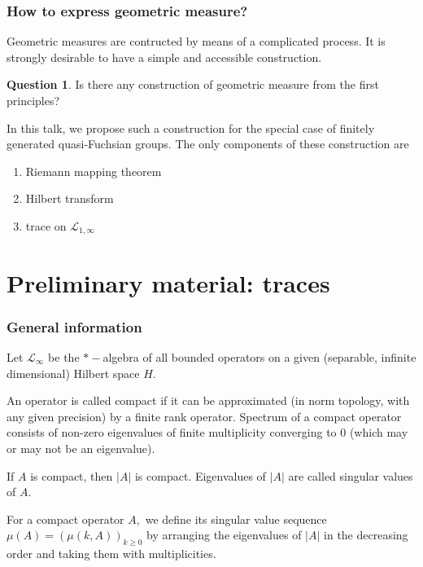 \documentclass{beamer}
\theoremstyle{definition}
\newtheorem{quest}{Question}
\begin{document}
\begin{frame}
\frametitle{How to express geometric measure?}

Geometric measures are contructed by means of a complicated process. It is strongly desirable to have a simple and accessible construction.

\begin{quest} Is there any construction of geometric measure from the first principles?
\end{quest}

In this talk, we propose such a construction for the special case of finitely generated quasi-Fuchsian groups. The only components of these construction are
\begin{enumerate}
\item Riemann mapping theorem
\item Hilbert transform 
\item trace on $\mathcal{L}_{1,\infty}$
\end{enumerate}
\end{frame}

\section{Preliminary material: traces}

\begin{frame} 
\frametitle{General information}

Let $\mathcal{L}_{\infty}$ be the $*-$algebra of all bounded operators on a given (separable, infinite dimensional) Hilbert space $H.$ 

An operator is called compact if it can be approximated (in norm topology, with any given precision) by a finite rank operator. Spectrum of a compact operator consists of non-zero eigenvalues of finite multiplicity converging to $0$ (which may or may not be an eigenvalue). 

If $A$ is compact, then $|A|$ is compact. Eigenvalues of $|A|$ are called singular values of $A.$

For a compact operator $A,$ we define its singular value sequence $\mu(A)=(\mu(k,A))_{k\geq0}$ by arranging the eigenvalues of $|A|$ in the decreasing order and taking them with multiplicities.
\end{frame}
\end{document}
